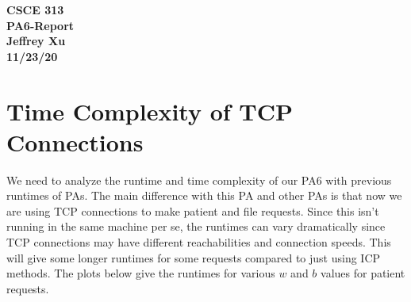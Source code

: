 \documentclass[12pt]{article}
\begin{document}
\begin{center}

{\bf
CSCE 313\\
PA6-Report\\
Jeffrey Xu\\
11/23/20\\
}

\end{center}

\section{Time Complexity of TCP Connections}

We need to analyze the runtime and time complexity of our PA6 with previous runtimes of PAs. The main difference with this PA and other PAs is that now we are using TCP connections to make patient and file requests. Since this isn't running in the same machine per se, the runtimes can vary dramatically since TCP connections may have different reachabilities and connection speeds. This will give some longer runtimes for some requests compared to just using ICP methods. The plots below give the runtimes for various $w$ and $b$ values for patient requests. 
\end{document}
